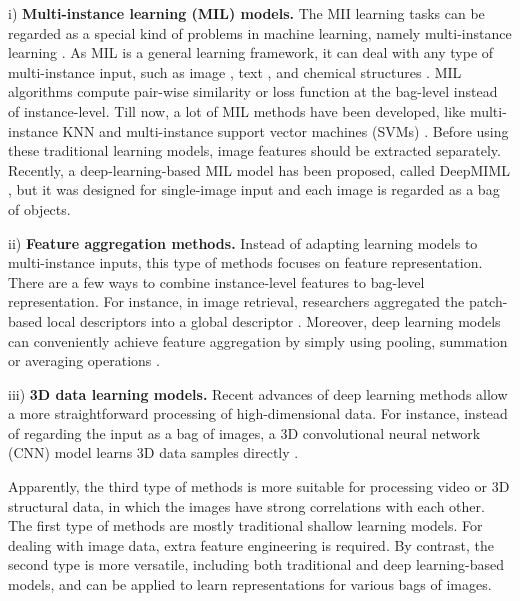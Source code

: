 \documentclass[10pt,twocolumn,letterpaper]{article}
\begin{document}
i) \textbf{Multi-instance learning (MIL) models.} The MII learning tasks can be regarded as a special kind of problems in machine learning, namely multi-instance learning \cite{zhou2004multi}. As MIL is a general learning framework, it can deal with any type of multi-instance input, such as image \cite{zha2008joint}, text \cite{zhou2005multi}, and chemical structures \cite{dietterich1997solving}. MIL algorithms compute pair-wise similarity or loss function at the bag-level instead of instance-level. Till now, a lot of MIL methods have been developed, like multi-instance KNN \cite{wang2000solving} and multi-instance support vector machines (SVMs) \cite{andrews2003support}. Before using these traditional learning models, image features should be extracted separately. Recently, a deep-learning-based MIL model has been proposed, called DeepMIML \cite{Feng2017AAAI}, but it was designed for single-image input and each image is regarded as a bag of objects. 

  
ii) \textbf{Feature aggregation methods.} Instead of adapting learning models to multi-instance inputs, this type of methods focuses on feature representation. There are a few ways to combine instance-level features to bag-level representation. For instance, in image retrieval, researchers aggregated the patch-based local descriptors into a global descriptor \cite{bov, fishervector, vlad}. Moreover, deep learning models can conveniently achieve feature aggregation by simply using pooling, summation or averaging operations \cite{ref23}. %

iii) \textbf{3D data learning models.} Recent advances of deep learning methods allow a more straightforward processing of high-dimensional data. For instance, instead of regarding the input as a bag of images, a 3D convolutional neural network (CNN) model learns 3D data samples directly \cite{kamnitsas2017efficient}.


Apparently, the third type of methods is more suitable for processing video or 3D structural data, in which the images have strong correlations with each other. The first type of methods are mostly traditional shallow learning models. For dealing with image data, extra feature engineering is required. By contrast, the second type is more versatile, including both traditional and deep learning-based models, and can be applied to learn representations for various bags of images.
\end{document}
